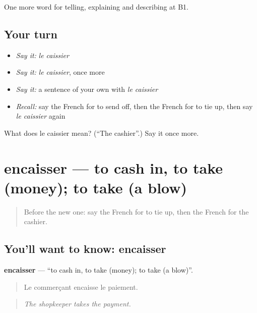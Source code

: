 \begin{grammarlens}[title={What you've built}]
One more word for telling, explaining and describing at B1.
\end{grammarlens}

\subsection*{Your turn}
\begin{itemize}
\raggedright
  \item \emph{Say it:} \emph{le caissier}
  \item \emph{Say it:} \emph{le caissier}, once more
  \item \emph{Say it:} a sentence of your own with \emph{le caissier}
  \item \emph{Recall:} say the French for to send off, then the French for to tie up, then say \emph{le caissier} again
\end{itemize}

\begin{tcolorbox}[breakable,colback=teal!4,colframe=teal!35!black,title={Before you move on}]
What does le caissier mean? (\textquotedblleft{}The cashier\textquotedblright{}.) Say it once more.
\end{tcolorbox}
\section[encaisser]{encaisser — to cash in, to take (money); to take (a blow)}

\label{lesson:FR-C450-encaisser}



\begin{quote}
Before the new one: say the French for to tie up, then the French for the cashier.
\end{quote}

\subsection*{You'll want to know: encaisser}
\textbf{encaisser} — \textquotedblleft{}to cash in, to take (money); to take (a blow)\textquotedblright{}.

\begin{quote}
Le commerçant encaisse le paiement.
\end{quote}

\begin{quote}
\emph{The shopkeeper takes the payment.}
\end{quote}


